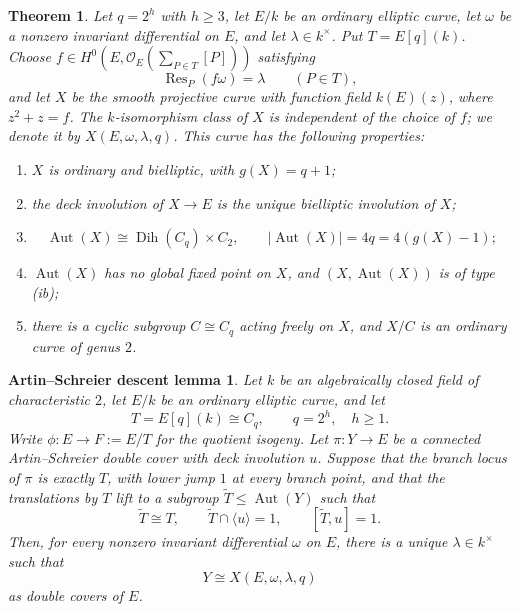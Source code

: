 \documentclass[10pt,a4paper]{amsart}
\newtheorem{theorem}{Theorem}
\newtheorem{ASdescent}{Artin--Schreier descent lemma}
\newcommand{\Aut}{\operatorname{Aut}}
\newcommand{\Dih}{\operatorname{Dih}}
\newcommand{\Res}{\operatorname{Res}}
\begin{document}
\begin{theorem}\label{thm:main}
Let $q=2^h$ with $h\ge3$, let $E/k$ be an ordinary elliptic curve, let
$\omega$ be a nonzero invariant differential on $E$, and let
$\lambda\in k^\times$.  Put $T=E[q](k)$.  Choose
$f\in H^0(E,\mathcal O_E(\sum_{P\in T}[P]))$ satisfying
\[
        \Res_P(f\omega)=\lambda\qquad(P\in T),
\]
and let $X$ be the smooth projective curve with function field
$k(E)(z)$, where $z^2+z=f$.  The $k$-isomorphism class of $X$ is
independent of the choice of $f$; we denote it by
$X(E,\omega,\lambda,q)$.  This curve has the following properties:
\begin{enumerate}[label=\textup{(\roman*)}]
\item $X$ is ordinary and bielliptic, with $g(X)=q+1$;
\item the deck involution of $X\to E$ is the unique bielliptic
involution of $X$;
\item
\[
        \Aut(X)\cong \Dih(C_q)\times C_2,
        \qquad
        |\Aut(X)|=4q=4(g(X)-1);
\]
\item $\Aut(X)$ has no global fixed point on $X$, and
$(X,\Aut(X))$ is of type \textup{(ib)};
\item there is a cyclic subgroup $C\cong C_q$ acting freely on $X$, and
$X/C$ is an ordinary curve of genus $2$.
\end{enumerate}
\end{theorem}

\begin{ASdescent}\label{lem:ASdescent}
Let $k$ be an algebraically closed field of characteristic $2$, let $E/k$
be an ordinary elliptic curve, and let
\[
        T=E[q](k)\cong C_q,\qquad q=2^h,\quad h\ge1.
\]
Write $\phi:E\to F:=E/T$ for the quotient isogeny.  Let
$\pi:Y\to E$ be a connected Artin--Schreier double cover with deck
involution $u$.  Suppose that the branch locus of $\pi$ is exactly $T$,
with lower jump $1$ at every branch point, and that the translations by
$T$ lift to a subgroup $\widetilde T\leq\Aut(Y)$ such that
\[
        \widetilde T\cong T,\qquad
        \widetilde T\cap\langle u\rangle=1,
        \qquad [\widetilde T,u]=1.
\]
Then, for every nonzero invariant differential $\omega$ on $E$, there is
a unique $\lambda\in k^\times$ such that
\[
        Y\cong X(E,\omega,\lambda,q)
\]
as double covers of $E$.
\end{ASdescent}
\end{document}
